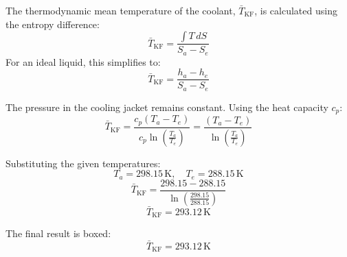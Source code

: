 The thermodynamic mean temperature of the coolant, \( \bar{T}_{\text{KF}} \), is calculated using the entropy difference:  
\[
\bar{T}_{\text{KF}} = \frac{\int T \, dS}{S_a - S_e}
\]  
For an ideal liquid, this simplifies to:  
\[
\bar{T}_{\text{KF}} = \frac{h_a - h_e}{S_a - S_e}
\]  

The pressure in the cooling jacket remains constant. Using the heat capacity \( c_p \):  
\[
\bar{T}_{\text{KF}} = \frac{c_p (T_a - T_e)}{c_p \ln \left( \frac{T_a}{T_e} \right)} = \frac{(T_a - T_e)}{\ln \left( \frac{T_a}{T_e} \right)}
\]  

Substituting the given temperatures:  
\[
T_a = 298.15 \, \text{K}, \quad T_e = 288.15 \, \text{K}
\]  
\[
\bar{T}_{\text{KF}} = \frac{298.15 - 288.15}{\ln \left( \frac{298.15}{288.15} \right)}
\]  
\[
\bar{T}_{\text{KF}} = 293.12 \, \text{K}
\]  

The final result is boxed:  
\[
\boxed{\bar{T}_{\text{KF}} = 293.12 \, \text{K}}
\]